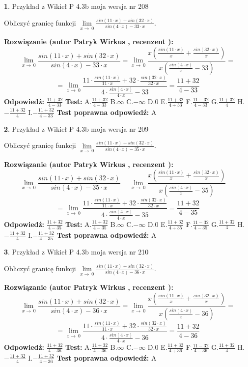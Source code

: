 \documentclass[12pt, a4paper]{article}
\theoremstyle{definition} %
\newtheorem{zad}{}
\newcommand{\zadStart}[1]{\begin{zad}#1\newline}
\newcommand{\zadStop}{\end{zad}}
\newcommand{\rozwStart}[2]{\noindent \textbf{Rozwiązanie (autor #1 , recenzent #2): }\newline}
\newcommand{\rozwStop}{\newline}
\newcommand{\odpStart}{\noindent \textbf{Odpowiedź:}\newline}
\newcommand{\odpStop}{\newline}
\newcommand{\testStart}{\noindent \textbf{Test:}\newline}
\newcommand{\testStop}{\newline}
\newcommand{\kluczStart}{\noindent \textbf{Test poprawna odpowiedź:}\newline}
\newcommand{\kluczStop}{\newline}
\begin{document}
\zadStart{Przykład z Wikieł P 4.3b moja wersja nr 208}


Obliczyć granicę funkcji $\lim\limits_{x\to\ 0}\frac{sin(11 \cdot x)+sin(32 \cdot x)}{sin(4 \cdot x)-33 \cdot x}$.
\zadStop
\rozwStart{Patryk Wirkus}{}
$$\lim\limits_{x\to\ 0}\frac{sin(11 \cdot x)+sin(32 \cdot x)}{sin(4 \cdot x)-33 \cdot x}=\lim\limits_{x\to\ 0}\frac{x(\frac{sin(11 \cdot x)}{x}+\frac{sin(32 \cdot x)}{x})}{x(\frac{sin(4 \cdot x)}{x}-33)}=$$
$$=\lim\limits_{x\to\ 0}\frac{11 \cdot \frac{sin(11 \cdot x)}{11 \cdot x}+32 \cdot \frac{sin(32 \cdot x)}{32 \cdot x}}{4 \cdot \frac{sin(4 \cdot x)}{4 \cdot x}-33}=\frac{11+32}{4-33}$$
\rozwStop
\odpStart
$\frac{11+32}{4-33}$
\odpStop
\testStart
A.$\frac{11+32}{4-33}$
B.$\infty$
C.$-\infty$
D.$0$
E.$\frac{11+32}{4+33}$
F.$\frac{11-32}{4-33}$
G.$\frac{11+32}{4}$
H.$-\frac{11+32}{4}$
I.$-\frac{11+32}{4-33}$
\testStop
\kluczStart
A
\kluczStop



\zadStart{Przykład z Wikieł P 4.3b moja wersja nr 209}


Obliczyć granicę funkcji $\lim\limits_{x\to\ 0}\frac{sin(11 \cdot x)+sin(32 \cdot x)}{sin(4 \cdot x)-35 \cdot x}$.
\zadStop
\rozwStart{Patryk Wirkus}{}
$$\lim\limits_{x\to\ 0}\frac{sin(11 \cdot x)+sin(32 \cdot x)}{sin(4 \cdot x)-35 \cdot x}=\lim\limits_{x\to\ 0}\frac{x(\frac{sin(11 \cdot x)}{x}+\frac{sin(32 \cdot x)}{x})}{x(\frac{sin(4 \cdot x)}{x}-35)}=$$
$$=\lim\limits_{x\to\ 0}\frac{11 \cdot \frac{sin(11 \cdot x)}{11 \cdot x}+32 \cdot \frac{sin(32 \cdot x)}{32 \cdot x}}{4 \cdot \frac{sin(4 \cdot x)}{4 \cdot x}-35}=\frac{11+32}{4-35}$$
\rozwStop
\odpStart
$\frac{11+32}{4-35}$
\odpStop
\testStart
A.$\frac{11+32}{4-35}$
B.$\infty$
C.$-\infty$
D.$0$
E.$\frac{11+32}{4+35}$
F.$\frac{11-32}{4-35}$
G.$\frac{11+32}{4}$
H.$-\frac{11+32}{4}$
I.$-\frac{11+32}{4-35}$
\testStop
\kluczStart
A
\kluczStop



\zadStart{Przykład z Wikieł P 4.3b moja wersja nr 210}


Obliczyć granicę funkcji $\lim\limits_{x\to\ 0}\frac{sin(11 \cdot x)+sin(32 \cdot x)}{sin(4 \cdot x)-36 \cdot x}$.
\zadStop
\rozwStart{Patryk Wirkus}{}
$$\lim\limits_{x\to\ 0}\frac{sin(11 \cdot x)+sin(32 \cdot x)}{sin(4 \cdot x)-36 \cdot x}=\lim\limits_{x\to\ 0}\frac{x(\frac{sin(11 \cdot x)}{x}+\frac{sin(32 \cdot x)}{x})}{x(\frac{sin(4 \cdot x)}{x}-36)}=$$
$$=\lim\limits_{x\to\ 0}\frac{11 \cdot \frac{sin(11 \cdot x)}{11 \cdot x}+32 \cdot \frac{sin(32 \cdot x)}{32 \cdot x}}{4 \cdot \frac{sin(4 \cdot x)}{4 \cdot x}-36}=\frac{11+32}{4-36}$$
\rozwStop
\odpStart
$\frac{11+32}{4-36}$
\odpStop
\testStart
A.$\frac{11+32}{4-36}$
B.$\infty$
C.$-\infty$
D.$0$
E.$\frac{11+32}{4+36}$
F.$\frac{11-32}{4-36}$
G.$\frac{11+32}{4}$
H.$-\frac{11+32}{4}$
I.$-\frac{11+32}{4-36}$
\testStop
\kluczStart
A
\kluczStop
\end{document}
